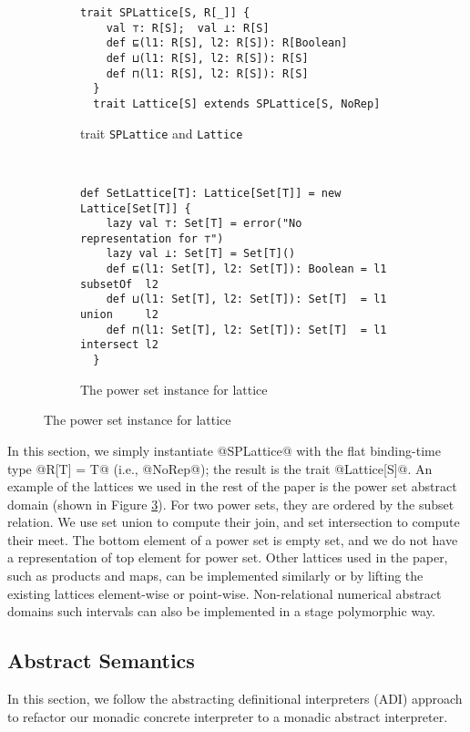 \begin{figure}[h!]
  \centering
  \begin{subfigure}[b]{0.45\textwidth}
  \begin{lstlisting}[style=small]
  trait SPLattice[S, R[_]] {
    val ⊤: R[S];  val ⊥: R[S]
    def ⊑(l1: R[S], l2: R[S]): R[Boolean]
    def ⊔(l1: R[S], l2: R[S]): R[S]
    def ⊓(l1: R[S], l2: R[S]): R[S]
  }
  trait Lattice[S] extends SPLattice[S, NoRep]
  \end{lstlisting}
  \caption{trait \texttt{SPLattice} and \texttt{Lattice}} \label{fig:splattice}
  \end{subfigure}
  ~
  \begin{subfigure}[b]{0.6\textwidth}
\begin{lstlisting}[style=small]
  def SetLattice[T]: Lattice[Set[T]] = new Lattice[Set[T]] {
    lazy val ⊤: Set[T] = error("No representation for ⊤")
    lazy val ⊥: Set[T] = Set[T]()
    def ⊑(l1: Set[T], l2: Set[T]): Boolean = l1 subsetOf  l2
    def ⊔(l1: Set[T], l2: Set[T]): Set[T]  = l1 union     l2
    def ⊓(l1: Set[T], l2: Set[T]): Set[T]  = l1 intersect l2
  }
\end{lstlisting}
  \caption{The power set instance for lattice} \label{fig:powerset}
\end{subfigure}
\end{figure}

In this section, we simply instantiate @SPLattice@ with the flat binding-time
type @R[T] = T@ (i.e., @NoRep@); the result is the trait @Lattice[S]@.
An example of the lattices we used in the rest of the paper is the power set
abstract domain (shown in Figure \ref{fig:powerset}). For two power sets,
they are ordered by the subset relation. We use set union to compute their
join, and set intersection to compute their meet.  The bottom element of a
power set is empty set, and we do not have a representation of top element for
power set.  Other lattices used in the paper, such as products and maps, can be
implemented similarly or by lifting the existing lattices element-wise or
point-wise.  Non-relational numerical abstract domains such intervals can also
be implemented in a stage polymorphic way.

\subsection{Abstract Semantics}

In this section, we follow the abstracting definitional interpreters
(ADI) approach \cite{DBLP:journals/pacmpl/DaraisLNH17} to refactor our monadic
concrete interpreter to a monadic abstract interpreter.

